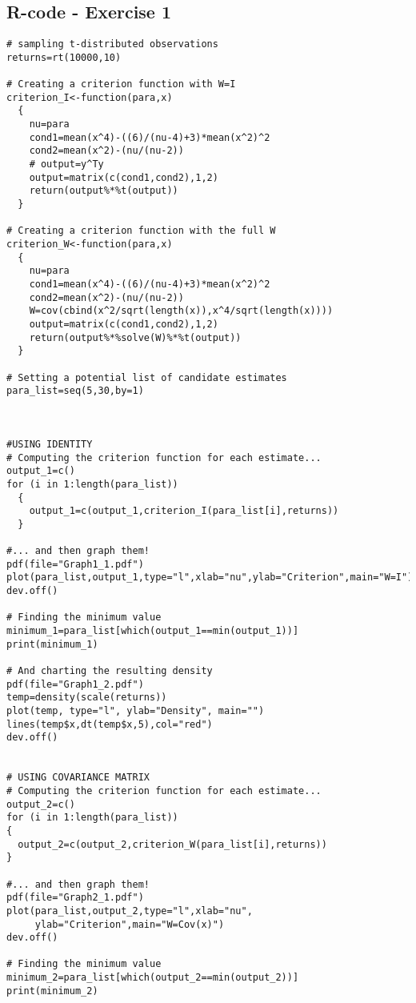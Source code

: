 \begin{appendices}

\chapter{R-code - Exercise 1}

\begin{verbatim}
# sampling t-distributed observations
returns=rt(10000,10)

# Creating a criterion function with W=I
criterion_I<-function(para,x)
  {
    nu=para
    cond1=mean(x^4)-((6)/(nu-4)+3)*mean(x^2)^2
    cond2=mean(x^2)-(nu/(nu-2))
    # output=y^Ty
    output=matrix(c(cond1,cond2),1,2)
    return(output%*%t(output))
  }

# Creating a criterion function with the full W
criterion_W<-function(para,x)
  {
    nu=para
    cond1=mean(x^4)-((6)/(nu-4)+3)*mean(x^2)^2
    cond2=mean(x^2)-(nu/(nu-2))
    W=cov(cbind(x^2/sqrt(length(x)),x^4/sqrt(length(x))))
    output=matrix(c(cond1,cond2),1,2)
    return(output%*%solve(W)%*%t(output))
  }

# Setting a potential list of candidate estimates
para_list=seq(5,30,by=1)



#USING IDENTITY
# Computing the criterion function for each estimate...
output_1=c()
for (i in 1:length(para_list))
  {
    output_1=c(output_1,criterion_I(para_list[i],returns))
  }

#... and then graph them!
pdf(file="Graph1_1.pdf")
plot(para_list,output_1,type="l",xlab="nu",ylab="Criterion",main="W=I")
dev.off()

# Finding the minimum value
minimum_1=para_list[which(output_1==min(output_1))]
print(minimum_1)

# And charting the resulting density
pdf(file="Graph1_2.pdf")
temp=density(scale(returns))
plot(temp, type="l", ylab="Density", main="")
lines(temp$x,dt(temp$x,5),col="red")
dev.off()


# USING COVARIANCE MATRIX
# Computing the criterion function for each estimate...
output_2=c()
for (i in 1:length(para_list))
{
  output_2=c(output_2,criterion_W(para_list[i],returns))
}

#... and then graph them!
pdf(file="Graph2_1.pdf")
plot(para_list,output_2,type="l",xlab="nu",
     ylab="Criterion",main="W=Cov(x)")
dev.off()

# Finding the minimum value
minimum_2=para_list[which(output_2==min(output_2))]
print(minimum_2)


\end{verbatim}
\end{appendices}
